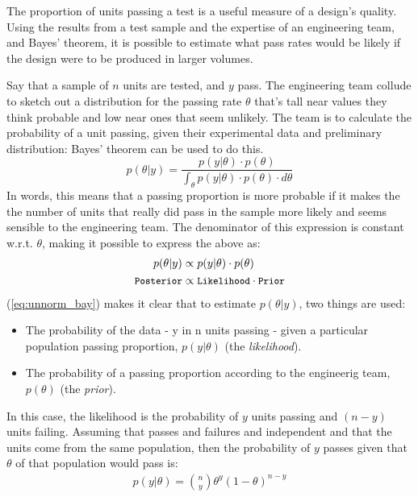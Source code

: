 \documentclass[11pt,a4paper,article]{memoir} %
\begin{document}
\par
The proportion of units passing a test is a useful measure of a design's quality. Using the results from a test sample and the expertise of an engineering team, and Bayes' theorem, it is possible to estimate what pass rates would be likely if the design were to be produced in larger volumes.
\par
Say that a sample of $n$ units are tested, and $y$ pass. The engineering team collude to sketch out a distribution for the passing rate $\theta$ that's tall near values they think probable and low near ones that seem unlikely. The team is to calculate the probability of a unit passing, given their experimental data and preliminary distribution: Bayes' theorem can be used to do this.
\begin{equation}
  p(\theta|y) = \frac{p(y|\theta)\cdot p(\theta)}{\int_{\theta}p(y|\theta)\cdot p(\theta)\cdot d\theta}
  \label{eq:bayes}
\end{equation}
In words, this means that a passing proportion is more probable if it makes the the number of units that really did pass in the sample more likely and seems sensible to the engineering team. The denominator of this expression is constant w.r.t. $\theta$, making it possible to express the above as:
\begin{align}
  p(\theta|y) &\propto p(y | \theta)\cdot p(\theta)   \label{eq:unnorm_bay} \\
  \small{\texttt{Posterior}} &\propto\small{{\texttt{Likelihood} \cdot \texttt{Prior}}} \nonumber
\end{align}
(\ref{eq:unnorm_bay}) makes it clear that to estimate $p(\theta|y)$, two things are used:
\begin{itemize}
\item The probability of the data - y in n units passing - given a particular population passing proportion, $p(y|\theta)$ (the \emph{likelihood}).
\item  The probability of a passing proportion according to the engineerig team, $p(\theta)$ (the \emph{prior}).
\end{itemize}
In this case, the likelihood is the probability of $y$ units passing and $(n-y)$ units failing. Assuming that passes and failures and independent and that the units come from the same population, then the probability of $y$ passes given that $\theta$ of that population would pass is:
\begin{gather}
  p(y|\theta) = \binom{n}{y} \theta^y (1 - \theta)^{n - y}
  \label{eq:binom_likelihood}
\end{gather}
\end{document}
